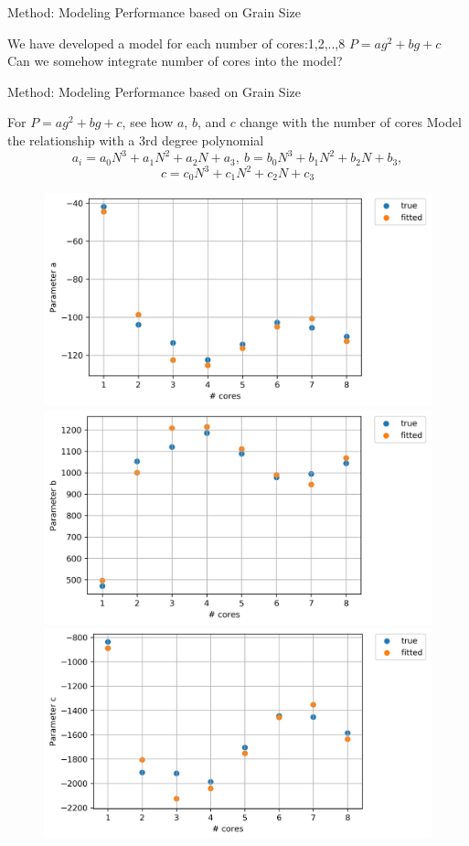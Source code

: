 \documentclass[10pt]{beamer}
\begin{document}
\begin{frame}{Method: Modeling Performance based on Grain Size}
	\begin{outline}	
		\1We have developed a model for each number of cores:1,2,..,8 $P=ag^2+bg+c$\\ 
		\1Can we somehow integrate number of cores into the model?
	\end{outline}
\end{frame}

\begin{frame}{Method: Modeling Performance based on Grain Size}
	\begin{outline}	
		\1For $P=ag^2+bg+c$, see how $a$, $b$, and $c$ change with the number of cores
		\1Model the relationship with a 3rd degree polynomial
		$$a_i=a_0N^3+a_1N^2+a_2N+a_3
		,\:b=b_0N^3+b_1N^2+b_2N+b_3,$$ $$c=c_0N^3+c_1N^2+c_2N+c_3$$
		\begin{figure}[H]
			\centering
			{\includegraphics[scale=.18]{images/polyfit/fig_690_params_0.png}\label{fig15:a}}
			{\includegraphics[scale=.18]{images/polyfit/fig_690_params_1.png}\label{fig15:b}}
			{\includegraphics[scale=.18]{images/polyfit/fig_690_params_2.png}\label{fig15:c}}

\end{figure}
\end{outline}
\end{frame}
\end{document}
